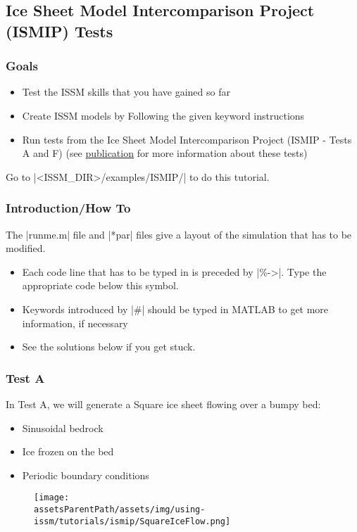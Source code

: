
\subsection{Ice Sheet Model Intercomparison Project (ISMIP) Tests} \label{sec:using-issm-tutorials-ismip}
\subsubsection{Goals} %
\begin{itemize}
	\item Test the ISSM skills that you have gained so far
	\item Create ISSM models by Following the given keyword instructions
	\item Run tests from the Ice Sheet Model Intercomparison Project (ISMIP - Tests A and F) (see \href{https://tc.copernicus.org/articles/2/95/2008/}{publication} for more information about these tests)
\end{itemize}

Go to \lstinlinebg|<ISSM_DIR>/examples/ISMIP/| to do this tutorial.

\subsubsection{Introduction/How To} %
The \lstinlinebg|runme.m| file and \lstinlinebg|*par| files give a layout of the simulation that has to be modified.
\begin{itemize}
	\item Each code line that has to be typed in is preceded by \lstinlinebg|\%->|. Type the appropriate code below this symbol.
	\item Keywords introduced by \lstinlinebg|#| should be typed in MATLAB to get more information, if necessary
	\item See the solutions below if you get stuck.
\end{itemize}

\subsubsection{Test A} %
In Test A, we will generate a Square ice sheet flowing over a bumpy bed:
\begin{itemize}
	\item Sinusoidal bedrock
	\item Ice frozen on the bed
	\item Periodic boundary conditions
\end{itemize}
\begin{figure}[H]
	\begin{center}
		\texttt{[image: \\assetsParentPath/assets/img/using-issm/tutorials/ismip/SquareIceFlow.png]}
	\end{center}
\end{figure}
